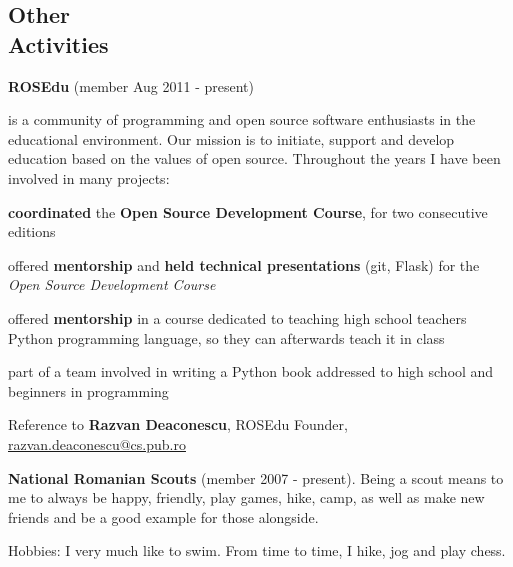 \documentclass[margin,line]{resume}
\begin{document}
\begin{resume}

    \section{\mysidestyle Other\\Activities}

    \textbf{ROSEdu} (member Aug 2011 - present)
    {\fontsize{2.65mm}{1em}\selectfont
      is a community of
      programming and open source software enthusiasts in the educational environment. Our mission is to
      initiate, support and develop education based on the values of open source.\vspace{1mm}
      Throughout the years I have been involved in many projects:
      \begin{list2}
          \item \textbf{coordinated} the \textbf{Open Source Development Course}, for two consecutive editions
          \item offered \textbf{mentorship} and \textbf{held technical presentations} (git, Flask) for the \textit{Open Source Development Course}
          \item offered \textbf{mentorship} in a course dedicated to teaching high school teachers Python programming language, so they can afterwards teach it in class
          \item part of a team involved in writing a Python book addressed to high school and beginners in programming
      \end{list2}\vspace{-3.5mm}
      Reference to \textbf{Razvan Deaconescu}, ROSEdu Founder, \href{mailto:razvan.deaconescu@cs.pub.ro}{razvan.deaconescu@cs.pub.ro}
    }

	\textbf{National Romanian Scouts} (member 2007 - present).
    {\fontsize{2.65mm}{1em}\selectfont
      Being a scout means to me to always be happy, friendly, play games, hike, camp, as well as make new friends and be a good example for those alongside.
    }

	Hobbies: I very much like to swim. From time to time, I hike, jog and play chess.



\end{resume}
\end{document}
